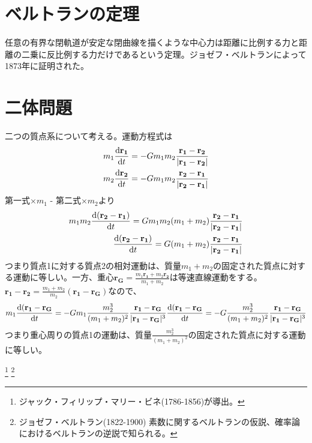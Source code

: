 \section{ベルトランの定理}
任意の有界な閉軌道が安定な閉曲線を描くような中心力は距離に比例する力と距離の二乗に反比例する力だけであるという定理。ジョゼフ・ベルトランによって1873年に証明された。

\section{二体問題}
	二つの質点系について考える。運動方程式は
	\begin{gather*}
		m_1\de[\mathbf{r_1}]{t} = - Gm_1m_2\frac{\mathbf{r_1} - \mathbf{r_2}}{|\mathbf{r_1} - \mathbf{r_2}|}\\
		m_2\de[\mathbf{r_2}]{t} = - Gm_1m_2\frac{\mathbf{r_2} - \mathbf{r_1}}{|\mathbf{r_2} - \mathbf{r_1}|}\\
	\end{gather*}
	第一式$\times m_1$ - 第二式$\times m_2$より
	\begin{align*}
		m_1m_2\de[(\mathbf{r_2} - \mathbf{r_1})]{t} = Gm_1m_2(m_1 + m_2)\frac{\mathbf{r_2} - \mathbf{r_1}}{|\mathbf{r_2} - \mathbf{r_1}|}\\
		\de[(\mathbf{r_2} - \mathbf{r_1})]{t} = G(m_1 + m_2)\frac{\mathbf{r_2} - \mathbf{r_1}}{|\mathbf{r_2} - \mathbf{r_1}|}\\
	\end{align*}
	つまり質点1に対する質点2の相対運動は、質量$m_1 + m_2$の固定された質点に対する運動に等しい。一方、重心$\mathbf{r_G} = \frac{m_1\mathbf{r_1} + m_2\mathbf{r_2}}{m_1 + m_2}$は等速直線運動をする。$\mathbf{r_1} - \mathbf{r_2} = \frac{m_1 + m_2}{m_2}(\mathbf{r_1} - \mathbf{r_G})$なので、
	\begin{align*}
		m_1\de[(\mathbf{r_1} - \mathbf{r_G}]{t} = - Gm_1\frac{m_2^3}{(m_1 + m_2)^2}\frac{\mathbf{r_1} - \mathbf{r_G}}{|\mathbf{r_1} - \mathbf{r_G}|^3}
		\de[(\mathbf{r_1} - \mathbf{r_G}]{t} = - G\frac{m_2^3}{(m_1 + m_2)^2}\frac{\mathbf{r_1} - \mathbf{r_G}}{|\mathbf{r_1} - \mathbf{r_G}|^3}
	\end{align*}
	つまり重心周りの質点1の運動は、質量$\frac{m_2^3}{(m_1 + m_2)^2}$の固定された質点に対する運動に等しい。

\footnote{
	ジャック・フィリップ・マリー・ビネ(1786-1856)が導出。
}
\footnote{
	ジョゼフ・ベルトラン(1822-1900) 素数に関するベルトランの仮説、確率論におけるベルトランの逆説で知られる。
}